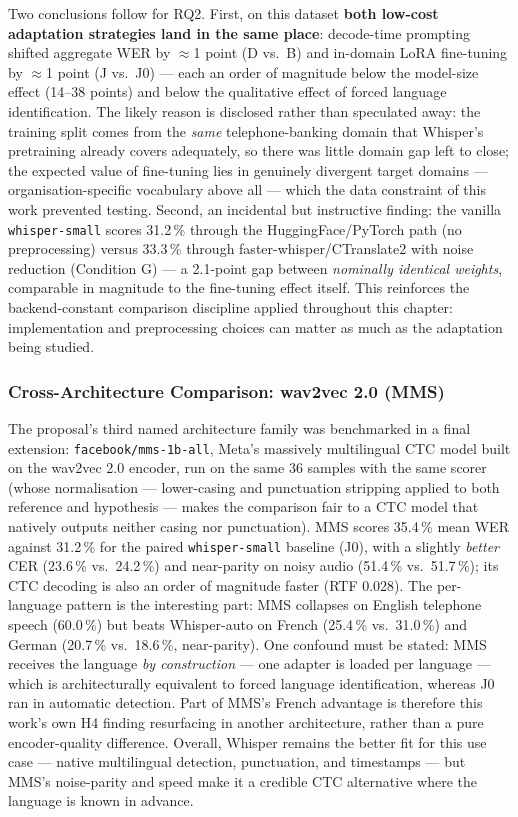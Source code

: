 \documentclass[12pt]{report}
\begin{document}
Two conclusions follow for RQ2. First, on this dataset \textbf{both low-cost adaptation strategies land in the same place}: decode-time prompting shifted aggregate WER by $\approx$1 point (D vs.\ B) and in-domain LoRA fine-tuning by $\approx$1 point (J vs.\ J0) --- each an order of magnitude below the model-size effect (14--38 points) and below the qualitative effect of forced language identification. The likely reason is disclosed rather than speculated away: the training split comes from the \emph{same} telephone-banking domain that Whisper's pretraining already covers adequately, so there was little domain gap left to close; the expected value of fine-tuning lies in genuinely divergent target domains --- organisation-specific vocabulary above all --- which the data constraint of this work prevented testing. Second, an incidental but instructive finding: the vanilla \texttt{whisper-small} scores 31.2\,\% through the HuggingFace/PyTorch path (no preprocessing) versus 33.3\,\% through faster-whisper/CTranslate2 with noise reduction (Condition G) --- a 2.1-point gap between \emph{nominally identical weights}, comparable in magnitude to the fine-tuning effect itself. This reinforces the backend-constant comparison discipline applied throughout this chapter: implementation and preprocessing choices can matter as much as the adaptation being studied.

\subsubsection{Cross-Architecture Comparison: wav2vec 2.0 (MMS)}

The proposal's third named architecture family was benchmarked in a final extension: \texttt{facebook/mms-1b-all}, Meta's massively multilingual CTC model built on the wav2vec 2.0 encoder, run on the same 36 samples with the same scorer (whose normalisation --- lower-casing and punctuation stripping applied to both reference and hypothesis --- makes the comparison fair to a CTC model that natively outputs neither casing nor punctuation). MMS scores 35.4\,\% mean WER against 31.2\,\% for the paired \texttt{whisper-small} baseline (J0), with a slightly \emph{better} CER (23.6\,\% vs.\ 24.2\,\%) and near-parity on noisy audio (51.4\,\% vs.\ 51.7\,\%); its CTC decoding is also an order of magnitude faster (RTF 0.028). The per-language pattern is the interesting part: MMS collapses on English telephone speech (60.0\,\%) but beats Whisper-auto on French (25.4\,\% vs.\ 31.0\,\%) and German (20.7\,\% vs.\ 18.6\,\%, near-parity). One confound must be stated: MMS receives the language \emph{by construction} --- one adapter is loaded per language --- which is architecturally equivalent to forced language identification, whereas J0 ran in automatic detection. Part of MMS's French advantage is therefore this work's own H4 finding resurfacing in another architecture, rather than a pure encoder-quality difference. Overall, Whisper remains the better fit for this use case --- native multilingual detection, punctuation, and timestamps --- but MMS's noise-parity and speed make it a credible CTC alternative where the language is known in advance.
\end{document}
